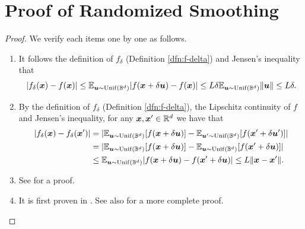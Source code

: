 
\section{Proof of Randomized Smoothing}

\propfdeltasmooth*

\begin{proof}
	We verify each items one by one as follows.
	\begin{enumerate}
		\item[(a)] It follows the definition of $f_{\delta}$ (Definition \ref{dfn:f-delta}) and Jensen's inequality that 
		\begin{align*}
			\vert f_{\delta}({\bm{x}}) - f({\bm{x}}) \vert \le \mathbb{E}_{{\bm{u}} \sim {\rm Unif}({\mathbb{B}}^d)} \vert f({\bm{x}} + \delta {\bm{u}}) -f({\bm{x}}) \vert \le L \delta \mathbb{E}_{{\bm{u}} \sim {\rm Unif}({\mathbb{B}}^d)} \Vert {\bm{u}} \Vert \le L \delta.
		\end{align*}
		\item[(b)] By the definition of $f_{\delta}$ (Definition \ref{dfn:f-delta}), the Lipschitz continuity of $f$ and Jensen's inequality, for any ${\bm{x}}, {\bm{x}}' \in {\mathbb{R}}^d$ we have that 
		\begin{align*}
			\vert f_{\delta}({\bm{x}}) - f_{\delta}({\bm{x}}') \vert &= \vert  \mathbb{E}_{{\bm{u}} \sim {\rm Unif}({\mathbb{B}}^d)} [f({\bm{x}}+ \delta {\bm{u}})] -  \mathbb{E}_{{\bm{u}}' \sim {\rm Unif}({\mathbb{B}}^d)} [f({\bm{x}}'+ \delta {\bm{u}}')] \vert \\
			&= \vert  \mathbb{E}_{{\bm{u}} \sim {\rm Unif}({\mathbb{B}}^d)} [f({\bm{x}}+ \delta {\bm{u}})] -  \mathbb{E}_{{\bm{u}} \sim {\rm Unif}({\mathbb{B}}^d)} [f({\bm{x}}' + \delta {\bm{u}})] \vert \\
			&\le \mathbb{E}_{{\bm{u}} \sim {\rm Unif}({\mathbb{B}}^d)} \vert f({\bm{x}}+ \delta {\bm{u}}) - f({\bm{x}}' + \delta {\bm{u}}) \vert \le L \Vert {\bm{x}} - {\bm{x}}' \Vert.
		\end{align*}
		\item[(c)] See \citep[Lemma 4]{kornowski2024algorithm} for a proof. 
		\item[(d)] It is first proven in \cite{yousefian2012stochastic}. See also \citep[Proposition 2.2]{lin2022gradient} for a more complete proof. 
	\end{enumerate}
\end{proof}

